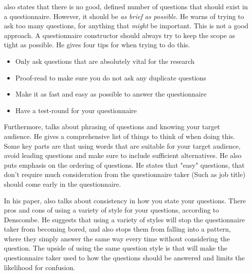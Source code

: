 \documentclass{cslthse-msc}
\begin{document}
    \citet{denscombe} also states that there is no good, defined number of questions that should exist in a questionnaire. However, it should be
    \textit{as brief as possible}. He warns of trying to ask too many questions, for anything that \textit{might} be important. This is not a good approach. A questionnaire constructor should always try to keep the scope as tight as possible. He gives four tips for when trying to do this.
    \begin{itemize}
        \item Only ask questions that are absolutely vital for the research
        \item Proof-read to make sure you do not ask any duplicate questions
        \item Make it as fast and easy as possible to answer the questionnaire
        \item Have a test-round for your questionnaire
    \end{itemize}
    Furthermore, \citet{denscombe} talks about phrasing of questions and knowing your target audience. He gives a comprehensive list of things to think of when doing this. Some key parts are that using words that are suitable for your target audience, avoid leading questions and make sure to include sufficient alternatives. He also puts emphasis on the ordering of questions. He states that "easy" questions, that don't require much consideration from the questionnaire taker (Such as job title) should come early in the questionnaire.

    In his paper, \citet{denscombe} also talks about consistency in how you state your questions.
    There pros and cons of using a variety of style for your questions, according to Denscombe. He suggests that using a variety of styles will stop the questionnaire taker from becoming bored, and also stops them from falling into a pattern, where they simply answer the same way every time without considering the question. The upside of using the same question style is that will make the questionnaire taker used to how the questions should be answered and limits the likelihood for confusion.
\end{document}
